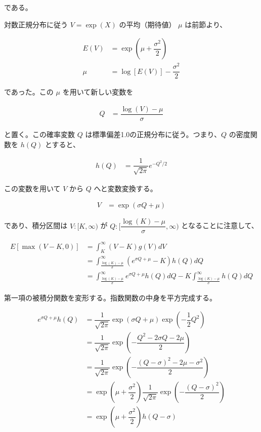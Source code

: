 \documentclass[uplatex]{jsarticle}
\begin{document}
である。

対数正規分布に従う $V = \exp(X)$ の平均（期待値） $\mu$ は前節より、

\begin{align}
	E(V) & = \exp( \mu + \dfrac{\sigma^{2}}{2} ) \\
	\mu  & = \log[E(V)] - \dfrac{\sigma^{2}}{2}
\end{align}

であった。この $\mu$ を用いて新しい変数を

\begin{align}
	Q & = \dfrac{\log(V) - \mu}{\sigma}
\end{align}

と置く。この確率変数 $Q$ は標準偏差1.0の正規分布に従う。つまり、$Q$ の密度関数を $h(Q)$ とすると、

\begin{align}
	h(Q) & = \dfrac{ 1 }{ \sqrt{2 \pi} } e^{ - Q^{2} / 2 }
\end{align}

この変数を用いて $V$ から $Q$ へと変数変換する。

\begin{align}
	V & = \exp(\sigma Q + \mu )
\end{align}

であり、積分区間は $V: [K , \infty)$ が $Q: [ \dfrac{\log(K) - \mu}{\sigma} , \infty)$ となることに注意して、

\begin{align}
	E \left[ \max(V-K,0) \right] & = \int^{\infty}_{K} (V-K) g(V) dV                                                                                                   \\
	                             & = \int^{\infty}_{\frac{\log(K) - \mu}{\sigma}} ( e^{\sigma Q + \mu } -K) h(Q) dQ                                                    \\
	                             & = \int^{\infty}_{\frac{\log(K) - \mu}{\sigma}} e^{\sigma Q + \mu } h(Q) dQ - K \int^{\infty}_{\frac{\log(K) - \mu}{\sigma}} h(Q) dQ
\end{align}

第一項の被積分関数を変形する。指数関数の中身を平方完成する。

\begin{align}
	e^{\sigma Q + \mu } h(Q) & = \dfrac{1}{\sqrt{2 \pi}} \exp(\sigma Q + \mu ) \exp(-\dfrac{1}{2} Q^{2})                           \\
	                         & = \dfrac{1}{\sqrt{2 \pi}} \exp( -\dfrac{ Q^{2} - 2 \sigma Q - 2 \mu }{2})                           \\
	                         & = \dfrac{1}{\sqrt{2 \pi}} \exp( -\dfrac{ (Q - \sigma)^{2} - 2 \mu - \sigma^{2} }{2})                \\
	                         & = \exp( \mu + \dfrac{\sigma^{2} }{2}) \dfrac{1}{\sqrt{2 \pi}} \exp( -\dfrac{ (Q - \sigma)^{2} }{2}) \\
	                         & = \exp( \mu + \dfrac{\sigma^{2} }{2}) h(Q - \sigma)
\end{align}
\end{document}
